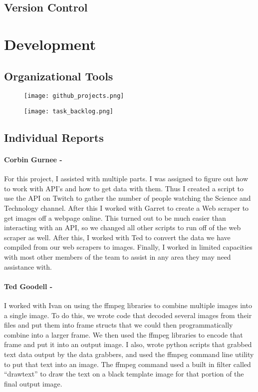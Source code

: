 \documentclass{article}
\begin{document}
  \subsection{Version Control}

\section{Development}
  \subsection{Organizational Tools}
  \begin{figure}[h!]
    \texttt{[image: github\_projects.png]}
    \caption{}
    \label{}
  \end{figure}

  \begin{figure}[h!]
    \texttt{[image: task\_backlog.png]}
    \caption{}
    \label{}
  \end{figure}
  \subsection{Individual Reports}
    \paragraph{Corbin Gurnee -}
    For this project, I assisted with multiple parts. I was assigned to figure out how to work with API’s and how to get data with them. Thus I created a script to use the API on Twitch to gather the number of people watching the Science and Technology channel. After this I worked with Garret to create a Web scraper to get images off a webpage online. This turned out to be much easier than interacting with an API, so we changed all other scripts to run off of the web scraper as well. After this, I worked with Ted to convert the data we have compiled from our web scrapers to images. Finally, I worked in limited capacities with most other members of the team to assist in any area they may need assistance with.
    \paragraph{Ted Goodell -}
    I worked with Ivan on using the ffmpeg libraries to combine multiple images into a single image. To do this, we wrote code that decoded several images from their files and put them into frame structs that we could then programmatically combine into a larger frame. We then used the ffmpeg libraries to encode that frame and put it into an output image. I also, wrote python scripts that grabbed text data output by the data grabbers, and used the ffmpeg command line utility to put that text into an image. The ffmpeg command used a built in filter called “drawtext” to draw the text on a black template image for that portion of the final output image.
\end{document}
